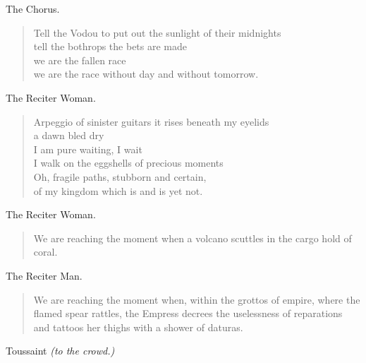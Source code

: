 \documentclass[letterpaper,article,12pt,oneside,notitlepage]{memoir}
\begin{document}
\begin{center}The Chorus.\end{center}

\begin{verse}
Tell the Vodou to put out the sunlight of their midnights \\
tell the bothrops the bets are made \\
we are the fallen race \\
we are the race without day and without tomorrow. \\
\end{verse}

\clearpage

\begin{center}The Reciter Woman.\end{center}

\begin{verse}
Arpeggio of sinister guitars it rises beneath my eyelids \\
a dawn bled dry \\
I am pure waiting, I wait \\
I walk on the eggshells of precious moments \\
Oh, fragile paths, stubborn and certain, \\
of my kingdom which is and is yet not. \\
\end{verse}

\begin{center}The Reciter Woman.\end{center}

\begin{verse}
\hspace{1cm} We are reaching the moment when a volcano scuttles in the cargo hold of coral. \\
\end{verse}

\begin{center}The Reciter Man.\end{center}

\begin{verse}
We are reaching the moment when, within the grottos of empire, where the flamed spear rattles, the Empress decrees the uselessness of reparations and tattoos her thighs with a shower of daturas. \\
\end{verse}

\begin{center}Toussaint \textit{(to the crowd.)}\end{center}
\end{document}

